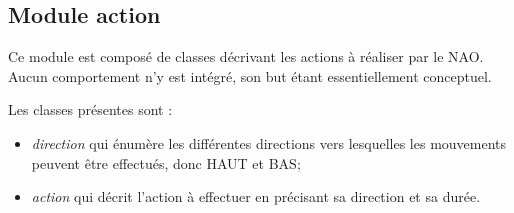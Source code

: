 \subsection{Module action}
\label{sub:Module action}
  \par Ce module est composé de classes décrivant les actions à réaliser par le NAO. Aucun comportement n'y est intégré, son but étant essentiellement conceptuel.
  \par Les classes présentes sont :
  \begin{itemize}
    \item \textit{direction} qui énumère les différentes directions vers lesquelles les mouvements peuvent être effectués, donc HAUT et BAS;
    \item \textit{action} qui décrit l'action à effectuer en précisant sa direction et sa durée.
  \end{itemize}
\pagebreak
